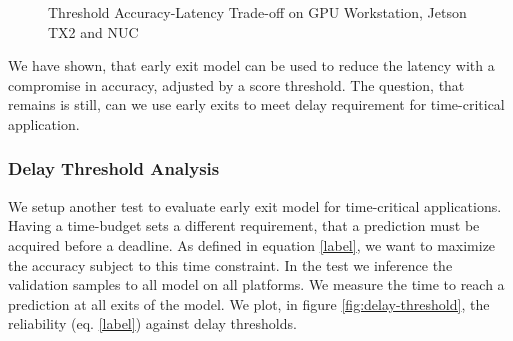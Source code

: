 \begin{figure}
	\caption[Threshold Accuracy-Latency Trade-off]{Threshold Accuracy-Latency Trade-off on \protect{} GPU Workstation, \protect{} Jetson TX2 and \protect{} NUC }
	\label{fig:threshold-acc-lat-trade-off-by-time}
\end{figure}

We have shown, that early exit model can be used to reduce the latency with a compromise in accuracy, adjusted by a score threshold. The question, that remains is still, can we use early exits to meet delay requirement for time-critical application. 

\subsubsection{Delay Threshold Analysis}

We setup another test to evaluate early exit model for time-critical applications. Having a time-budget sets a different requirement, that a prediction must be acquired before a deadline. As defined in equation \ref{label}, we want to maximize the accuracy subject to this time constraint. In the test we inference the validation samples to all model on all platforms. We measure the time to reach a prediction at all exits of the model. We plot, in figure \ref{fig:delay-threshold}, the reliability (eq. \ref{label}) against delay thresholds.

